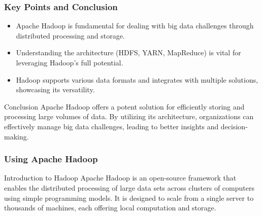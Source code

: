 \documentclass[aspectratio=169]{beamer}
\begin{document}
\begin{frame}[fragile]
    \frametitle{Key Points and Conclusion}
    \begin{itemize}
        \item Apache Hadoop is fundamental for dealing with big data challenges through distributed processing and storage.
        \item Understanding the architecture (HDFS, YARN, MapReduce) is vital for leveraging Hadoop's full potential.
        \item Hadoop supports various data formats and integrates with multiple solutions, showcasing its versatility.
    \end{itemize}
    
    \begin{block}{Conclusion}
        Apache Hadoop offers a potent solution for efficiently storing and processing large volumes of data. By utilizing its architecture, organizations can effectively manage big data challenges, leading to better insights and decision-making.
    \end{block}
\end{frame}

\begin{frame}
    \frametitle{Using Apache Hadoop}
    \begin{block}{Introduction to Hadoop}
        Apache Hadoop is an open-source framework that enables the distributed processing of large data sets across clusters of computers using simple programming models. It is designed to scale from a single server to thousands of machines, each offering local computation and storage.
    \end{block}
\end{frame}
\end{document}
